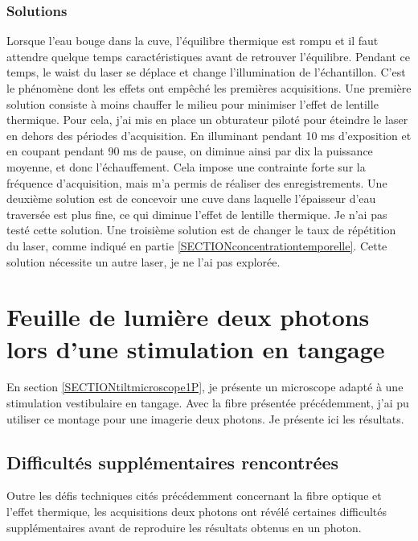 \subsubsection{Solutions}\label{solutionseffetthermique}

Lorsque l'eau bouge dans la cuve, l'équilibre thermique est rompu et il faut attendre quelque temps caractéristiques avant de retrouver l'équilibre. Pendant ce temps, le waist du laser se déplace et change l'illumination de l'échantillon. C'est le phénomène dont les effets ont empêché les premières acquisitions. Une première solution consiste à moins chauffer le milieu pour minimiser l'effet de lentille thermique. Pour cela, j'ai mis en place un obturateur piloté pour éteindre le laser en dehors des périodes d'acquisition. En illuminant pendant 10 ms d'exposition et en coupant pendant 90 ms de pause, on diminue ainsi par dix la puissance moyenne, et donc l'échauffement. Cela impose une contrainte forte sur la fréquence d'acquisition, mais m'a permis de réaliser des enregistrements.
Une deuxième solution est de concevoir une cuve dans laquelle l'épaisseur d'eau traversée est plus fine, ce qui diminue l'effet de lentille thermique. Je n'ai pas testé cette solution.
Une troisième solution est de changer le taux de répétition du laser, comme indiqué en partie \ref{SECTIONconcentrationtemporelle}. Cette solution nécessite un autre laser, je ne l'ai pas explorée.



\section[Tangage deux photons]{Feuille de lumière deux photons lors d'une stimulation en tangage}

En section \ref{SECTIONtiltmicroscope1P}, je présente un microscope adapté à une stimulation vestibulaire en tangage. Avec la fibre présentée précédemment, j'ai pu utiliser ce montage pour une imagerie deux photons. Je présente ici les résultats.

\subsection{Difficultés supplémentaires rencontrées}

Outre les défis techniques cités précédemment concernant la fibre optique et l'effet thermique, les acquisitions deux photons ont révélé certaines difficultés supplémentaires avant de reproduire les résultats obtenus en un photon.

